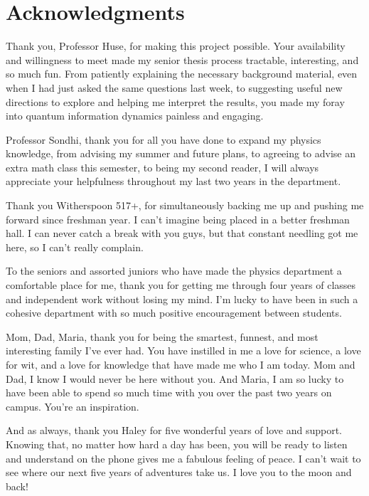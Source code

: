 \newpage

\section*{Acknowledgments}

Thank you, Professor Huse, for making this project possible. Your availability and willingness to meet made my senior thesis process tractable, interesting, and so much fun. From patiently explaining the necessary background material, even when I had just asked the same questions last week, to suggesting useful new directions to explore and helping me interpret the results, you made my foray into quantum information dynamics painless and engaging. 

Professor Sondhi, thank you for all you have done to expand my physics knowledge, from advising my summer and future plans, to agreeing to advise an extra math class this semester, to being my second reader, I will always appreciate your helpfulness throughout my last two years in the department. 

Thank you Witherspoon 517+, for simultaneously backing me up and pushing me forward  since freshman year. I can't imagine being placed in a better freshman hall. I can never catch a break with you guys, but that constant needling got me here, so I can't really complain.

To the seniors and assorted juniors who have made the physics department a comfortable place for me, thank you for getting me through four years of classes and independent work without losing my mind. I'm lucky to have been in such a cohesive department with so much positive encouragement between students.

Mom, Dad, Maria, thank you for being the smartest, funnest, and most interesting family I've ever had. You have instilled in me a love for science, a love for wit, and a love for knowledge that have made me who I am today. Mom and Dad, I know I would never be here without you. And Maria, I am so lucky to have been able to spend so much time with you over the past two years on campus. You're an inspiration.

And as always, thank you Haley for five wonderful years of love and support. Knowing that, no matter how hard a day has been, you will be ready to listen and understand on the phone gives me a fabulous feeling of peace. I can't wait to see where our next five years of adventures take us. I love you to the moon and back!

\newpage

\tableofcontents
